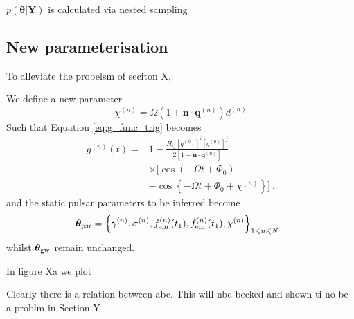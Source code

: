 \documentclass[fleqn,usenatbib,useAMS]{mnras}
\begin{document}
$p(\boldsymbol{\theta} | \boldsymbol{Y})$ is calculated via nested sampling








%
%









\subsection{New parameterisation}

To alleviate the probelsm of seciton X, 

We define a new parameter 
\begin{equation}
\chi^{(n)} = \Omega \left( 1 + \boldsymbol{n}\cdot \boldsymbol{q}^{(n)} \right)  d^{(n)} 
\end{equation}
Such that Equation \eqref{eq:g_func_trig} becomes
\begin{align}
	g^{(n)}(t) =& 1 - \frac{ H_{ij}[q^{(n)}]^i [q^{(n)}]^j }{2 [1 + \boldsymbol{n}\cdot \boldsymbol{q}^{(n)}] } \nonumber \\
	& \times \Big[\cos\left(-\Omega t +\Phi_0\right) \nonumber \\
	&- \cos \left \{-\Omega t +\Phi_0 + \chi^{(n)} \right \} \Big ] \ .
	\label{eq:g_func_trig_chi}
\end{align}
and the static pulsar parameters to be inferred become
\begin{equation}
	\boldsymbol{\theta}_{\rm psr} = \left \{ \gamma^{(n)},\sigma^{(n)}, f_{\rm em}^{(n)}(t_1),\dot{f}_{\rm em}^{(n)}(t_1),\chi^{(n)}\right\}_{1\leq n \leq N} \ .  \label{eq:psrparams}
\end{equation}
whilst $\boldsymbol{\theta}_{\rm gw}$  remain unchanged.



In figure Xa we plot



Clearly there is a relation between abc. This will nbe becked and shown ti no be a problm in Section Y
\end{document}
